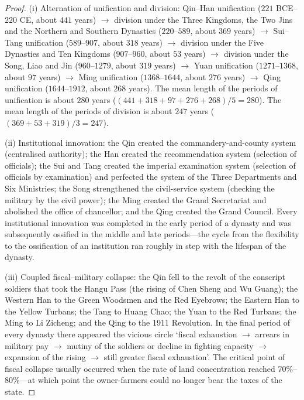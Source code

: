 \begin{proof}
(i) Alternation of unification and division: Qin--Han unification ($221$ BCE--$220$ CE, about $441$ years) $\to$ division under the Three Kingdoms, the Two Jins and the Northern and Southern Dynasties ($220$--$589$, about $369$ years) $\to$ Sui--Tang unification ($589$--$907$, about $318$ years) $\to$ division under the Five Dynasties and Ten Kingdoms ($907$--$960$, about $53$ years) $\to$ division under the Song, Liao and Jin ($960$--$1279$, about $319$ years) $\to$ Yuan unification ($1271$--$1368$, about $97$ years) $\to$ Ming unification ($1368$--$1644$, about $276$ years) $\to$ Qing unification ($1644$--$1912$, about $268$ years). The mean length of the periods of unification is about $280$ years ($(441+318+97+276+268)/5=280$). The mean length of the periods of division is about $247$ years ($(369+53+319)/3=247$).

(ii) Institutional innovation: the Qin created the commandery-and-county system (centralised authority); the Han created the recommendation system (selection of officials); the Sui and Tang created the imperial examination system (selection of officials by examination) and perfected the system of the Three Departments and Six Ministries; the Song strengthened the civil-service system (checking the military by the civil power); the Ming created the Grand Secretariat and abolished the office of chancellor; and the Qing created the Grand Council. Every institutional innovation was completed in the early period of a dynasty and was subsequently ossified in the middle and late periods---the cycle from the flexibility to the ossification of an institution ran roughly in step with the lifespan of the dynasty.

(iii) Coupled fiscal--military collapse: the Qin fell to the revolt of the conscript soldiers that took the Hangu Pass (the rising of Chen Sheng and Wu Guang); the Western Han to the Green Woodsmen and the Red Eyebrows; the Eastern Han to the Yellow Turbans; the Tang to Huang Chao; the Yuan to the Red Turbans; the Ming to Li Zicheng; and the Qing to the 1911 Revolution. In the final period of every dynasty there appeared the vicious circle `fiscal exhaustion $\to$ arrears in military pay $\to$ mutiny of the soldiers or decline in fighting capacity $\to$ expansion of the rising $\to$ still greater fiscal exhaustion'. The critical point of fiscal collapse usually occurred when the rate of land concentration reached $70\%$--$80\%$---at which point the owner-farmers could no longer bear the taxes of the state.
\end{proof}

